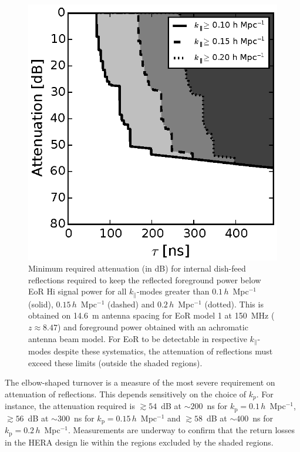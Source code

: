 \documentclass[preprint2,iop,numberedappendix,twocolappendix,appendixfloats]{emulateapj}
\begin{document}
\begin{figure}[htb]
  \centering
  \includegraphics[width=\linewidth]{f3.eps}
  \caption{Minimum required attenuation (in dB) for internal dish-feed reflections required to keep the reflected foreground power below EoR H{\sc i} signal power for all $k_\parallel$-modes greater than $0.1\,h$~Mpc$^{-1}$ (solid), $0.15\,h$~Mpc$^{-1}$ (dashed) and $0.2\,h$~Mpc$^{-1}$ (dotted). This is obtained on 14.6~m antenna spacing for EoR model 1 at 150~MHz ($z\approx 8.47$) and foreground power obtained with an achromatic antenna beam model. For EoR to be detectable in respective $k_\parallel$-modes despite these systematics, the attenuation of reflections must exceed these limits (outside the shaded regions).}
  \label{fig:fg-reflections-achrmbeam}
\end{figure}

The elbow-shaped turnover is a measure of the most severe requirement on attenuation of reflections. This depends sensitively on the choice of $k_p$. For instance, the attenuation required is $\gtrsim 54$~dB at $\sim 200$~ns for $k_\textrm{p}=0.1\,h$~Mpc$^{-1}$, $\gtrsim 56$~dB at $\sim 300$~ns for $k_\textrm{p}=0.15\,h$~Mpc$^{-1}$ and $\gtrsim 58$~dB at $\sim 400$~ns for $k_\textrm{p}=0.2\,h$~Mpc$^{-1}$. Measurements are underway \citep{pat16} to confirm that the return losses in the HERA design lie within the regions excluded by the shaded regions.
\end{document}
